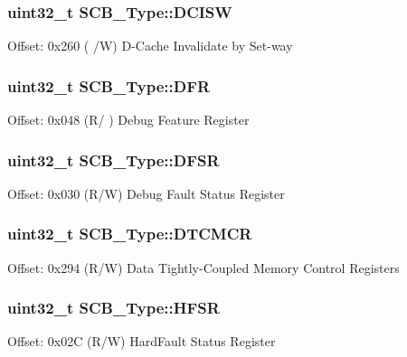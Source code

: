 \subsubsection[{\texorpdfstring{D\+C\+I\+SW}{DCISW}}]{ uint32\+\_\+t S\+C\+B\+\_\+\+Type\+::\+D\+C\+I\+SW}\hypertarget{struct_s_c_b___type_a50230b7ffe2728d6fb9e317a15978ab3}{}\label{struct_s_c_b___type_a50230b7ffe2728d6fb9e317a15978ab3}
Offset\+: 0x260 ( /W) D-\/\+Cache Invalidate by Set-\/way 
\subsubsection[{\texorpdfstring{D\+FR}{DFR}}]{ uint32\+\_\+t S\+C\+B\+\_\+\+Type\+::\+D\+FR}\hypertarget{struct_s_c_b___type_a586a5225467262b378c0f231ccc77f86}{}\label{struct_s_c_b___type_a586a5225467262b378c0f231ccc77f86}
Offset\+: 0x048 (R/ ) Debug Feature Register 
\subsubsection[{\texorpdfstring{D\+F\+SR}{DFSR}}]{ uint32\+\_\+t S\+C\+B\+\_\+\+Type\+::\+D\+F\+SR}\hypertarget{struct_s_c_b___type_ad7d61d9525fa9162579c3da0b87bff8d}{}\label{struct_s_c_b___type_ad7d61d9525fa9162579c3da0b87bff8d}
Offset\+: 0x030 (R/W) Debug Fault Status Register 
\subsubsection[{\texorpdfstring{D\+T\+C\+M\+CR}{DTCMCR}}]{ uint32\+\_\+t S\+C\+B\+\_\+\+Type\+::\+D\+T\+C\+M\+CR}\hypertarget{struct_s_c_b___type_a1728cb36883856a3543286d9acfb8a0d}{}\label{struct_s_c_b___type_a1728cb36883856a3543286d9acfb8a0d}
Offset\+: 0x294 (R/W) Data Tightly-\/\+Coupled Memory Control Registers 
\subsubsection[{\texorpdfstring{H\+F\+SR}{HFSR}}]{ uint32\+\_\+t S\+C\+B\+\_\+\+Type\+::\+H\+F\+SR}\hypertarget{struct_s_c_b___type_a7bed53391da4f66d8a2a236a839d4c3d}{}\label{struct_s_c_b___type_a7bed53391da4f66d8a2a236a839d4c3d}
Offset\+: 0x02C (R/W) Hard\+Fault Status Register 
